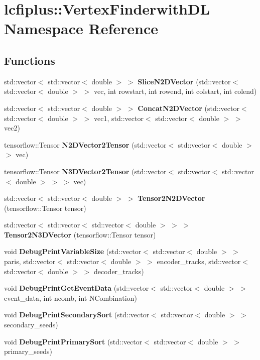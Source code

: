 \section{lcfiplus\+:\+:Vertex\+Finderwith\+DL Namespace Reference}
\label{namespacelcfiplus_1_1VertexFinderwithDL}
\subsection*{Functions}
\begin{DoxyCompactItemize}
\item 
std\+::vector$<$ std\+::vector$<$ double $>$ $>$ \textbf{ Slice\+N2\+D\+Vector} (std\+::vector$<$ std\+::vector$<$ double $>$ $>$ vec, int rowstart, int rowend, int colstart, int colend)
\item 
std\+::vector$<$ std\+::vector$<$ double $>$ $>$ \textbf{ Concat\+N2\+D\+Vector} (std\+::vector$<$ std\+::vector$<$ double $>$ $>$ vec1, std\+::vector$<$ std\+::vector$<$ double $>$ $>$ vec2)
\item 
tensorflow\+::\+Tensor \textbf{ N2\+D\+Vector2\+Tensor} (std\+::vector$<$ std\+::vector$<$ double $>$ $>$ vec)
\item 
tensorflow\+::\+Tensor \textbf{ N3\+D\+Vector2\+Tensor} (std\+::vector$<$ std\+::vector$<$ std\+::vector$<$ double $>$ $>$ $>$ vec)
\item 
std\+::vector$<$ std\+::vector$<$ double $>$ $>$ \textbf{ Tensor2\+N2\+D\+Vector} (tensorflow\+::\+Tensor tensor)
\item 
std\+::vector$<$ std\+::vector$<$ std\+::vector$<$ double $>$ $>$ $>$ \textbf{ Tensor2\+N3\+D\+Vector} (tensorflow\+::\+Tensor tensor)
\item 
void \textbf{ Debug\+Print\+Variable\+Size} (std\+::vector$<$ std\+::vector$<$ double $>$ $>$ paris, std\+::vector$<$ std\+::vector$<$ double $>$ $>$ encoder\+\_\+tracks, std\+::vector$<$ std\+::vector$<$ double $>$ $>$ decoder\+\_\+tracks)
\item 
void \textbf{ Debug\+Print\+Get\+Event\+Data} (std\+::vector$<$ std\+::vector$<$ double $>$ $>$ event\+\_\+data, int ncomb, int N\+Combination)
\item 
void \textbf{ Debug\+Print\+Secondary\+Sort} (std\+::vector$<$ std\+::vector$<$ double $>$ $>$ secondary\+\_\+seeds)
\item 
void \textbf{ Debug\+Print\+Primary\+Sort} (std\+::vector$<$ std\+::vector$<$ double $>$ $>$ primary\+\_\+seeds)
\item 

\end{DoxyCompactItemize}

